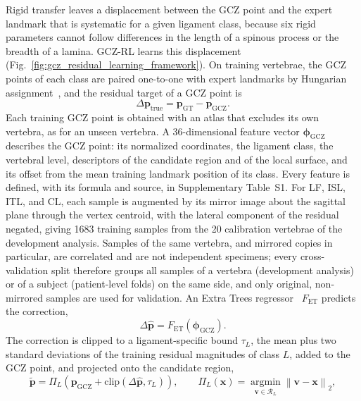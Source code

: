 \documentclass[5p,times,twocolumn,authoryear]{elsarticle}
\begin{document}
Rigid transfer leaves a displacement between the GCZ point and the expert landmark that is systematic for a given ligament class, because six rigid parameters cannot follow differences in the length of a spinous process or the breadth of a lamina. GCZ-RL learns this displacement (Fig.~\ref{fig:gcz_residual_learning_framework}). On training vertebrae, the GCZ points of each class are paired one-to-one with expert landmarks by Hungarian assignment~\citep{kuhn1955}, and the residual target of a GCZ point is
\begin{equation}
  \Delta \mathbf{p}_{\mathrm{true}} = \mathbf{p}_{\mathrm{GT}} - \mathbf{p}_{\mathrm{GCZ}} .
  \label{eq:residual_target}
\end{equation}
Each training GCZ point is obtained with an atlas that excludes its own vertebra, as for an unseen vertebra. A 36-dimensional feature vector $\boldsymbol{\phi}_{\mathrm{GCZ}}$ describes the GCZ point: its normalized coordinates, the ligament class, the vertebral level, descriptors of the candidate region and of the local surface, and its offset from the mean training landmark position of its class. Every feature is defined, with its formula and source, in Supplementary Table~S1. For LF, ISL, ITL, and CL, each sample is augmented by its mirror image about the sagittal plane through the vertex centroid, with the lateral component of the residual negated, giving 1683 training samples from the 20 calibration vertebrae of the development analysis. Samples of the same vertebra, and mirrored copies in particular, are correlated and are not independent specimens; every cross-validation split therefore groups all samples of a vertebra (development analysis) or of a subject (patient-level folds) on the same side, and only original, non-mirrored samples are used for validation. An Extra Trees regressor~\citep{geurts2006} $F_{\mathrm{ET}}$ predicts the correction,
\begin{equation}
  \Delta \hat{\mathbf{p}} = F_{\mathrm{ET}}(\boldsymbol{\phi}_{\mathrm{GCZ}}).
  \label{eq:residual_prediction}
\end{equation}
The correction is clipped to a ligament-specific bound $\tau_L$, the mean plus two standard deviations of the training residual magnitudes of class $L$, added to the GCZ point, and projected onto the candidate region,
\begin{equation}
  \tilde{\mathbf{p}} = \Pi_L\!\left(\mathbf{p}_{\mathrm{GCZ}} + \mathrm{clip}(\Delta \hat{\mathbf{p}}, \tau_L)\right),
  \qquad
  \Pi_L(\mathbf{x}) = \operatorname*{argmin}_{\mathbf{v}\in\mathcal{R}_L} \left\| \mathbf{v} - \mathbf{x} \right\|_2 ,
  \label{eq:corrected_point}
\end{equation}
\end{document}
